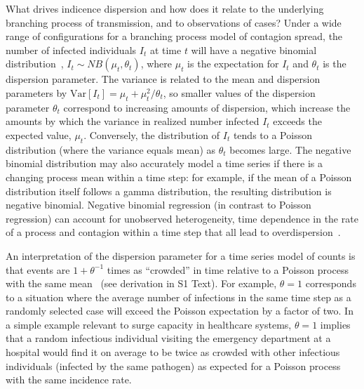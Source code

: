 \documentclass[11pt,letterpaper]{article}
\begin{document}
\begin{Abstract}
What drives indicence dispersion and how does it relate to the underlying branching process of transmission, and to observations of cases? 
Under a wide range of configurations for a branching process model of contagion spread, the number of infected individuals $I_t$ at time $t$ will have a negative binomial distribution~\citep{kendall1949stochastic, grenfell2002dynamics}, $I_t \sim NB \left( \mu_t, \theta_t \right)$, where $\mu_t$ is the expectation for $I_t$ and $\theta_t$ is the dispersion parameter. 
The variance is related to the mean and dispersion parameters by $\mathrm{Var}[I_t] = \mu_t + \mu_t^2 / \theta_t$, so smaller values of the dispersion parameter $\theta_t$ correspond to increasing amounts of dispersion, which increase the amounts by which the variance in realized number infected $I_t$ exceeds the expected value, $\mu_t$. 
Conversely, the distribution of $I_t$ tends to a Poisson distribution (where the variance equals mean) as $\theta_t$ becomes large. 
The negative binomial distribution may also accurately model a time series if there is a changing process mean within a time step: for example, if the mean of a Poisson distribution itself follows a gamma distribution, the resulting distribution is negative binomial. 
Negative binomial regression (in contrast to Poisson regression) can account for unobserved heterogeneity, time dependence in the rate of a process and contagion within a time step that all lead to overdispersion~\citep{barron1992analysis}.

An interpretation of the dispersion parameter for a time series model of counts is that events are $1 + \theta^{-1}$ times as ``crowded'' in time relative to a Poisson process with the same mean~\citep{lloyd1967mean} (see derivation in S1 Text). 
For example, $\theta = 1$ corresponds to a situation where the average number of infections in the same time step as a randomly selected case will exceed the Poisson expectation by a factor of two. 
In a simple example relevant to surge capacity in healthcare systems, $\theta = 1$ implies that a random infectious individual visiting the emergency department at a hospital would find it on average to be twice as crowded with other infectious individuals (infected by the same pathogen) as expected for a Poisson process with the same incidence rate.


\end{Abstract}
\end{document}
